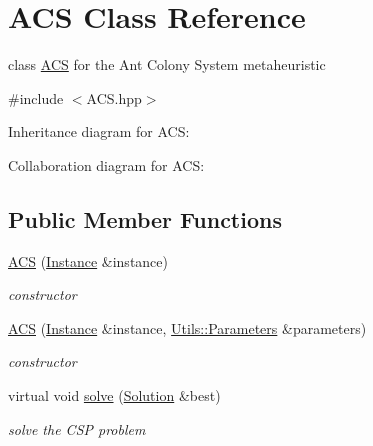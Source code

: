 \hypertarget{classACS}{}\section{A\+CS Class Reference}
\label{classACS}


class \hyperlink{classACS}{A\+CS} for the Ant Colony System metaheuristic  




{\ttfamily \#include $<$A\+C\+S.\+hpp$>$}



Inheritance diagram for A\+CS\+:


Collaboration diagram for A\+CS\+:
\subsection*{Public Member Functions}
\begin{DoxyCompactItemize}
\item 
\hyperlink{classACS_aaa5e05d45ead3655754aa7df3c0e005c}{A\+CS} (\hyperlink{classInstance}{Instance} \&instance)
\begin{DoxyCompactList}\small\item\em constructor \end{DoxyCompactList}\item 
\hyperlink{classACS_a7b4ff2040a973b6bf8ac6f96916fc52d}{A\+CS} (\hyperlink{classInstance}{Instance} \&instance, \hyperlink{classUtils_1_1Parameters}{Utils\+::\+Parameters} \&parameters)
\begin{DoxyCompactList}\small\item\em constructor \end{DoxyCompactList}\item 
virtual void \hyperlink{classACS_a6629ce98a1027c8d548357c068291f7a}{solve} (\hyperlink{classSolution}{Solution} \&best)
\begin{DoxyCompactList}\small\item\em solve the C\+SP problem \end{DoxyCompactList}\end{DoxyCompactItemize}
